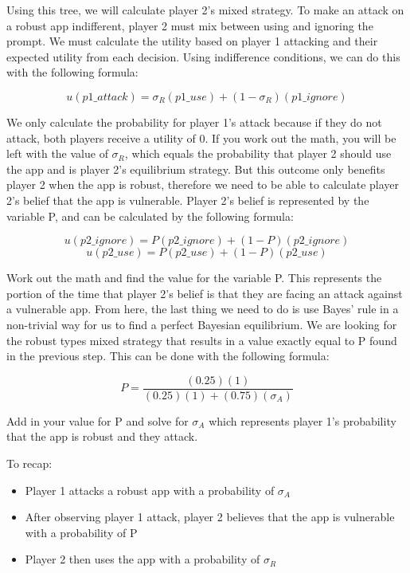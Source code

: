 \documentclass[letterpaper,12pt]{report}
\begin{document}
Using this tree, we will calculate player 2's mixed strategy. To make an attack on a robust app indifferent, player 2 must mix between using and ignoring the prompt. We must calculate the utility based on player 1 attacking and their expected utility from each decision. Using indifference conditions, we can do this with the following formula:

$$ u(p1\_attack) = \sigma_R(p1\_use) + (1 - \sigma_R)(p1\_ignore) $$

We only calculate the probability for player 1's attack because if they do not attack, both players receive a utility of 0. If you work out the math, you will be left with the value of $\sigma_R$, which equals the probability that player 2 should use the app and is player 2's equilibrium strategy. But this outcome only benefits player 2 when the app is robust, therefore we need to be able to calculate player 2's belief that the app is vulnerable. Player 2's belief is represented by the variable P, and can be calculated by the following formula:

$$ u(p2\_ignore) = P(p2\_ignore) + (1 - P)(p2\_ignore) $$
$$ u(p2\_use) = P(p2\_use) + (1 - P)(p2\_use) $$

Work out the math and find the value for the variable P. This represents the portion of the time that player 2's belief is that they are facing an attack against a vulnerable app. From here, the last thing we need to do is use Bayes' rule in a non-trivial way for us to find a perfect Bayesian equilibrium. We are looking for the robust types mixed strategy that results in a value exactly equal to P found in the previous step. This can be done with the following formula:

$$ P = \frac{(0.25)(1)}{(0.25)(1) + (0.75) (\sigma_A)} $$

Add in your value for P and solve for $\sigma_A$ which represents player 1's probability that the app is robust and they attack. 

To recap:
    \begin{itemize}
        \item Player 1 attacks a robust app with a probability of $\sigma_A$
        \item After observing player 1 attack, player 2 believes that the app is vulnerable with a probability of P
        \item Player 2 then uses the app with a probability of $\sigma_R$
    \end{itemize}

\bigskip
\bigskip
\bigskip
\end{document}
